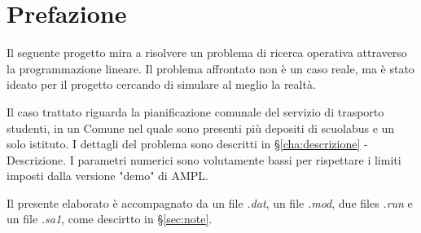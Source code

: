 
\chapter{Prefazione}

\ifpdf
    \graphicspath{{Chapter1/Figs/Raster/}{Chapter1/Figs/PDF/}{Chapter1/Figs/}}
\else
    \graphicspath{{Chapter1/Figs/Vector/}{Chapter1/Figs/}}
\fi


Il seguente progetto mira a risolvere un problema di ricerca operativa attraverso la programmazione lineare. Il problema affrontato non è un caso reale, ma è stato ideato per il progetto cercando di simulare al meglio la realtà.

Il caso trattato riguarda la pianificazione comunale del servizio di trasporto studenti, in un Comune nel quale sono presenti più depositi di scuolabus e un solo istituto. I dettagli del problema sono descritti in §\ref{cha:descrizione} - Descrizione. I parametri numerici sono volutamente bassi per rispettare i limiti imposti dalla versione "demo" di AMPL.

Il presente elaborato è accompagnato da un file \textit{.dat}, un file \textit{.mod}, due files \textit{.run} e un file \textit{.sa1}, come descirtto in §\ref{sec:note}.